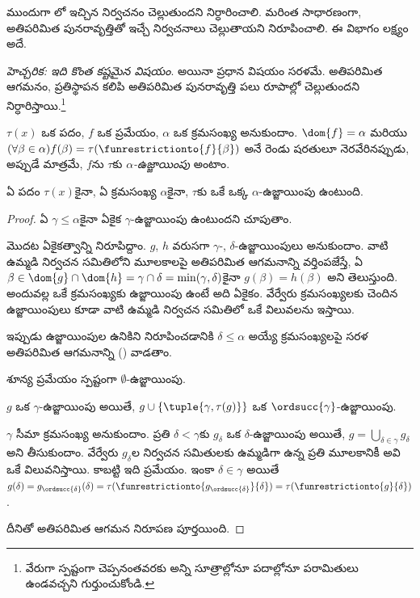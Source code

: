 \documentclass[../../../include/open-logic-section]{subfiles}
\begin{document}

ముందుగా లో ఇచ్చిన నిర్వచనం
చెల్లుతుందని నిర్ధారించాలి. మరింత సాధారణంగా, అతిపరిమిత
పునరావృత్తితో ఇచ్చే నిర్వచనాలు చెల్లుతాయని నిరూపించాలి.
ఈ విభాగం లక్ష్యం అదే.

\emph{హెచ్చరిక: ఇది కొంత కష్టమైన విషయం}. అయినా ప్రధాన
విషయం సరళమే. అతిపరిమిత ఆగమనం, ప్రతిస్థాపన కలిపి
అతిపరిమిత పునరావృత్తి పలు రూపాల్లో చెల్లుతుందని
నిర్ధారిస్తాయి.\footnote{వేరుగా స్పష్టంగా చెప్పనంతవరకు
అన్ని సూత్రాల్లోనూ పదాల్లోనూ పరామితులు ఉండవచ్చని గుర్తుంచుకోండి.}

\begin{defn}
	$\tau(x)$ ఒక పదం,
	$f$ ఒక ప్రమేయం,
	$\alpha$ ఒక క్రమసంఖ్య
	అనుకుందాం.
	$\dom{f} = \alpha$
	మరియు
	$(\forall \beta \in \alpha)f(\beta) = \tau(\funrestrictionto{f}{\beta})$
	అనే రెండు షరతులూ నెరవేరినప్పుడు, అప్పుడే మాత్రమే,
	$f$ను $\tau$కు
	\emph{$\alpha$-ఉజ్జాయింపు}
	అంటాం.
\end{defn}

\begin{lem}[హద్దుగల పునరావృత్తి]
ఏ పదం $\tau(x)$కైనా,
ఏ క్రమసంఖ్య $\alpha$కైనా,
$\tau$కు ఒకే ఒక్క
$\alpha$-ఉజ్జాయింపు
ఉంటుంది.
\end{lem}
\begin{proof}
ఏ $\gamma \leq \alpha$కైనా
ఏకైక $\gamma$-ఉజ్జాయింపు
ఉంటుందని చూపుతాం.

మొదట ఏకైకత్వాన్ని నిరూపిద్దాం. $g$, $h$
వరుసగా $\gamma$-, $\delta$-ఉజ్జాయింపులు అనుకుందాం.
వాటి ఉమ్మడి నిర్వచన సమితిలోని మూలకాలపై
అతిపరిమిత ఆగమనాన్ని వర్తింపజేస్తే, ఏ
$\beta \in \dom{g} \cap \dom{h} =
\gamma \cap \delta = \min(\gamma, \delta)$కైనా
$g(\beta) = h(\beta)$ అని తెలుస్తుంది.
అందువల్ల ఒకే క్రమసంఖ్యకు ఉజ్జాయింపు ఉంటే అది ఏకైకం.
వేర్వేరు క్రమసంఖ్యలకు చెందిన ఉజ్జాయింపులు కూడా వాటి ఉమ్మడి
నిర్వచన సమితిలో ఒకే విలువలను ఇస్తాయి.

ఇప్పుడు ఉజ్జాయింపుల ఉనికిని నిరూపించడానికి
$\delta \leq \alpha$ అయ్యే క్రమసంఖ్యలపై సరళ అతిపరిమిత
ఆగమనాన్ని () వాడతాం.

శూన్య ప్రమేయం స్పష్టంగా
$\emptyset$-ఉజ్జాయింపు.

$g$ ఒక
$\gamma$-ఉజ్జాయింపు
అయితే,
$g \cup
\{\tuple{\gamma, \tau(g)}\}$
ఒక $\ordsucc{\gamma}$-ఉజ్జాయింపు.

$\gamma$ సీమా క్రమసంఖ్య అనుకుందాం. ప్రతి
$\delta < \gamma$కు $g_\delta$ ఒక
$\delta$-ఉజ్జాయింపు అయితే, $g = \bigcup_{\delta \in \gamma} g_\delta$
అని తీసుకుందాం. వేర్వేరు $g_\delta$ల నిర్వచన సమితులకు ఉమ్మడిగా
ఉన్న ప్రతి మూలకానికీ అవి ఒకే విలువనిస్తాయి. కాబట్టి ఇది ప్రమేయం.
ఇంకా $\delta \in \gamma$
అయితే $g(\delta) = g_{\ordsucc{\delta}}(\delta) =
\tau(\funrestrictionto{g_{\ordsucc{\delta}}}{\delta}) =
\tau(\funrestrictionto{g}{\delta})$.

దీనితో అతిపరిమిత
ఆగమన నిరూపణ పూర్తయింది.
\end{proof}
\end{document}

